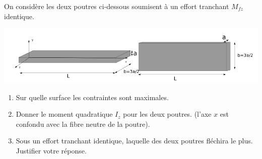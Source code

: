 \documentclass[lecture.tex]{subfiles}
\begin{document}
\exercice{}

On considère les deux poutres ci-dessous soumisent à  un  effort  tranchant $M_{fz}$ identique.

\begin{center}
  \includegraphics[scale=0.5]{exo-poutre-section-rectangle.png}
\end{center}

\begin{enumerate}
  \item Sur quelle surface les contraintes sont maximales.
  \item Donner le moment quadratique $I_z$ pour les deux poutres. (l’axe $x$  est confondu avec la fibre neutre de la poutre).
  \item Sous  un  effort  tranchant  identique,  laquelle  des  deux  poutres  fléchira  le  plus. Justifier votre réponse.
\end{enumerate}


\finexercice
\end{document}
